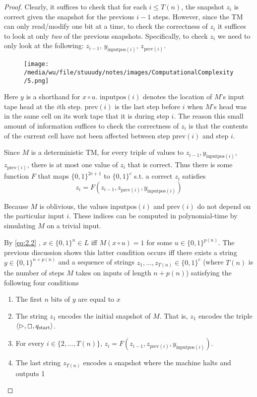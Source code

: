 \documentclass[11pt]{article}
\def \start {\text{start}}
\begin{document}
\begin{enumerate}
\begin{proof}
Clearly, it suffices to check that for each \(i\le T(n)\), the snapshot \(z_i\) is correct
given the snapshot for the previous \(i-1\) steps. However, since the TM can only read/modify
one bit at a time, to check the correctness of \(z_i\) it suffices to look at only \emph{two} of the
previous snapshots. Specifically, to check \(z_i\) we need to only look at the following:
\(z_{i-1}\), \(y_{\text{inputpos}(i)}\), \(z_{\text{prev}(i)}\). 

\begin{figure}[htbp]
\centering
\texttt{[image: /media/wu/file/stuuudy/notes/images/ComputationalComplexity/5.png]}
\end{figure}

Here \(y\) is a shorthand
for \(x\circ u\). \(\text{inputpos}(i)\) denotes the location of \(M\)'s input tape head at
the \(i\)th step. \(\text{prev}(i)\) is the last step before \(i\) when \(M\)'s head was in the
same cell on its work tape that it is during step \(i\). The reason this small amount of
information suffices to check the correctness of \(z_i\) is that the contents of the current
cell have not been affected between step \(\text{prev}(i)\) and step \(i\).

Since \(M\) is a deterministic TM, for every triple of values
to \(z_{i-1},y_{\text{inputpos}(i)}\), \(z_{\text{prev}(i)}\), there is at most one value
of \(z_i\) that is correct. Thus there is some function \(F\) that maps \(\{0,1\}^{2c+1}\)
to \(\{0,1\}^c\) s.t. a correct \(z_i\) satisfies
     \begin{equation*}
z_i=F(z_{i-1},z_{\text{prev}(i)},y_{\text{inputpos}(i)})
     \end{equation*}

Because \(M\) is oblivious, the values \(\text{inputpos}(i)\) and \(\text{prev}(i)\) do not
depend on the particular input \(i\). These indices can be computed in polynomial-time by
simulating \(M\) on a trivial input.

By \eqref{eq:2.2} , \(x\in\{0,1\}^{n}\in L\) iff \(M(x\circ u)=1\) for
some \(u\in\{0,1\}^{p(n)}\). The previous discussion shows this latter condition occurs iff
there exists a string \(y\in\{0,1\}^{n+p(n)}\) and a sequence of strings
\(z_1,\dots,z_{T(n)}\in\{0,1\}^c\) (where \(T(n)\) is the number of steps \(M\) takes on inputs
of length \(n+p(n)\)) satisfying the following four conditions
\begin{enumerate}
\item The first \(n\) bits of \(y\) are equal to \(x\)
\item The string \(z_1\) encodes the initial snapshot of \(M\). That is, \(z_1\) encodes the
triple \(\la\rhd,\Box,q_{\start}\ra\).
\item For every \(i\in\{2,\dots,T(n)\}\), \(z_i=F(z_{i-1},z_{\text{prev}(i)},y_{\text{inputpos}(i)})\).
\item The last string \(z_{T(n)}\) encodes a snapshot where the machine halts and outputs 1
\end{enumerate}



\end{proof}
\end{enumerate}
\end{document}

